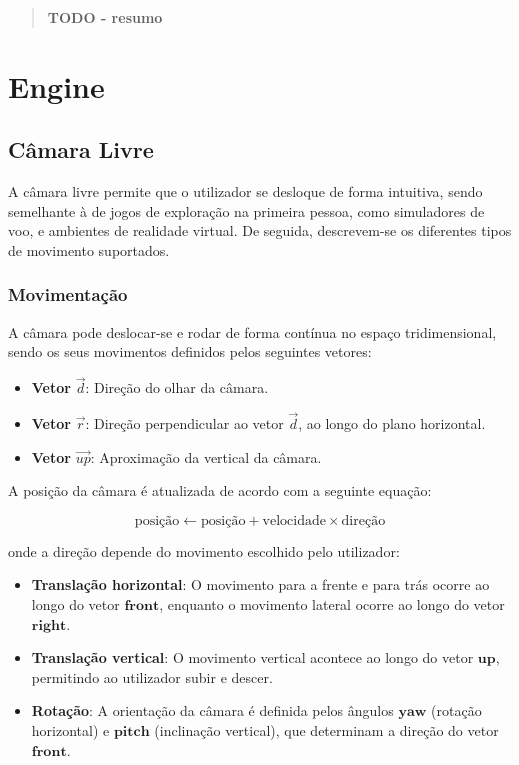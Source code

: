 \documentclass[12pt, a4paper]{article}
\begin{document}
\pagebreak

\begin{abstract}
    \textbf{\color{red} TODO - resumo}
\end{abstract}

\section{Engine}

\subsection{Câmara Livre}

A câmara livre permite que o utilizador se desloque de forma intuitiva, sendo semelhante à de
jogos de exploração na primeira pessoa, como simuladores de voo, e ambientes de realidade
virtual.
De seguida, descrevem-se os diferentes tipos de movimento suportados.

\subsubsection{Movimentação}

A câmara pode deslocar-se e rodar de forma contínua no espaço tridimensional, sendo os seus
movimentos definidos pelos seguintes vetores:

\begin{itemize}
    \item \textbf{Vetor} $\vec d$: Direção do olhar da câmara.
    \item \textbf{Vetor} $\vec r$: Direção perpendicular ao vetor $\vec d$, ao
          longo do plano horizontal.
    \item \textbf{Vetor} $\vec {up}$: Aproximação da vertical da câmara.
\end{itemize}

A posição da câmara é atualizada de acordo com a seguinte equação:

\[
\text{posição} \gets \text{posição} + \text{velocidade} \times \text{direção}
\]

onde a direção depende do movimento escolhido pelo utilizador:

\begin{itemize}
    \item \textbf{Translação horizontal}: O movimento para a frente e para trás ocorre ao longo
          do vetor $\mathbf{front}$, enquanto o movimento lateral ocorre ao longo do vetor
          $\mathbf{right}$.
    \item \textbf{Translação vertical}: O movimento vertical acontece ao longo do vetor
          $\mathbf{up}$, permitindo ao utilizador subir e descer.
    \item \textbf{Rotação}: A orientação da câmara é definida pelos ângulos $\mathbf{yaw}$
          (rotação horizontal) e $\mathbf{pitch}$ (inclinação vertical), que determinam a direção
          do vetor $\mathbf{front}$.
\end{itemize}
\end{document}
